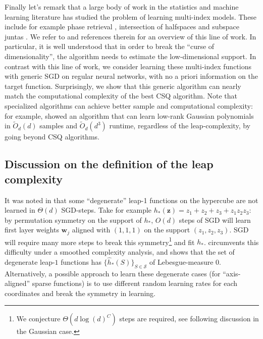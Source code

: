 \documentclass[11pt]{article}
\newcommand{\<}{\langle}
\renewcommand{\>}{\rangle}
\theoremstyle{definition}
\def\bw{{\boldsymbol w}}
\def\bz{{\boldsymbol z}}
\def\cS{{\mathcal S}}
\def\bz{{\boldsymbol z}}
\def\bw{{\boldsymbol w}}
\def\bz{{\boldsymbol z}}
\def\cS{{\mathcal S}}
\begin{document}
Finally let's remark that a large body of work in the statistics and machine learning literature has studied the problem of learning multi-index models. These include for example phase retrieval \citep{candes2013phaselift}, intersection of halfspaces \citep{klivans2004learning,vempala2010random} and subspace juntas \citep{vempala2011structure,de2019your}. We refer to \cite{dudeja2018learning,chen2020learning} and references therein for an overview of this line of work. In particular, it is well understood that in order to break the ``curse of dimensionality'', the algorithm needs to estimate the low-dimensional support. In contrast with this line of work, we consider learning these multi-index functions with generic SGD on regular neural networks, with no a priori information on the target function. Surprisingly, we show that this generic algorithm can nearly match the computational complexity of the best CSQ algorithm. Note that specialized algorithms can achieve better sample and computational complexity: for example, \cite{chen2020learning} showed an algorithm that can learn low-rank Gaussian polynomials in $\widetilde{O}_d (d)$ samples and $\widetilde{O}_d (d^3)$ runtime, regardless of the leap-complexity, by going beyond CSQ algorithms. 






\subsection{Discussion on the definition of the leap complexity}
\label{app:discussion_leap}

It was noted in \cite{abbe2022merged} that some ``degenerate'' leap-1 functions on the hypercube  are not learned in $\Theta (d)$ SGD-steps. Take for example $h_*(\bz) = z_1 + z_2 + z_3 + z_1z_2z_3$: by permutation symmetry on the support of $h_*$, $O(d)$ steps of SGD will learn first layer weights $\bw_j$ aligned with $(1,1,1)$ on the support $(z_1 ,z_2,z_3)$. SGD will require many more steps to break this symmetry\footnote{We conjecture $\Theta (d\log (d)^C)$ steps are required, see following discussion in the Gaussian case.} and fit $h_*$. \cite{abbe2022merged} circumvents this difficulty under a smoothed complexity analysis, and shows that the set of degenerate leap-$1$ functions has $\{ \hat h_* (S) \}_{S \in \cS} $ of Lebesgue-measure $0$. Alternatively, a possible approach to learn these degenerate cases (for ``axis-aligned'' sparse functions) is to use different random learning rates for each coordinates and break the symmetry in learning.
\end{document}
